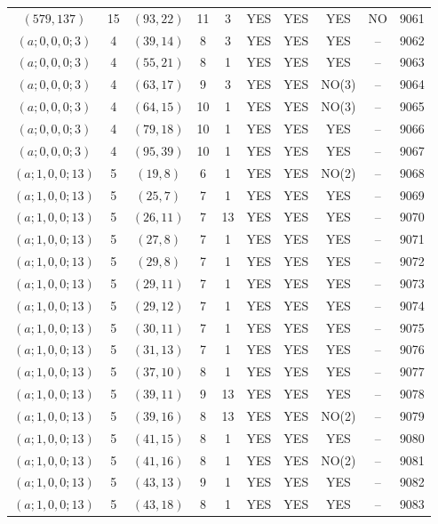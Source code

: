 \begin{longtable}{|c|c|c|c|c|c|c|c|c|c|}
$(579, 137)$ & 15 & $(93, 22)$ & 11 & 3 & YES & YES & YES & NO & 9061\\
$(a; 0, 0, 0; 3)$ & 4 & $(39, 14)$ & 8 & 3 & YES & YES & YES & -- & 9062\\
$(a; 0, 0, 0; 3)$ & 4 & $(55, 21)$ & 8 & 1 & YES & YES & YES & -- & 9063\\
$(a; 0, 0, 0; 3)$ & 4 & $(63, 17)$ & 9 & 3 & YES & YES & NO(3) & -- & 9064\\
$(a; 0, 0, 0; 3)$ & 4 & $(64, 15)$ & 10 & 1 & YES & YES & NO(3) & -- & 9065\\
$(a; 0, 0, 0; 3)$ & 4 & $(79, 18)$ & 10 & 1 & YES & YES & YES & -- & 9066\\
$(a; 0, 0, 0; 3)$ & 4 & $(95, 39)$ & 10 & 1 & YES & YES & YES & -- & 9067\\
$(a; 1, 0, 0; 13)$ & 5 & $(19, 8)$ & 6 & 1 & YES & YES & NO(2) & -- & 9068\\
$(a; 1, 0, 0; 13)$ & 5 & $(25, 7)$ & 7 & 1 & YES & YES & YES & -- & 9069\\
$(a; 1, 0, 0; 13)$ & 5 & $(26, 11)$ & 7 & 13 & YES & YES & YES & -- & 9070\\
$(a; 1, 0, 0; 13)$ & 5 & $(27, 8)$ & 7 & 1 & YES & YES & YES & -- & 9071\\
$(a; 1, 0, 0; 13)$ & 5 & $(29, 8)$ & 7 & 1 & YES & YES & YES & -- & 9072\\
$(a; 1, 0, 0; 13)$ & 5 & $(29, 11)$ & 7 & 1 & YES & YES & YES & -- & 9073\\
$(a; 1, 0, 0; 13)$ & 5 & $(29, 12)$ & 7 & 1 & YES & YES & YES & -- & 9074\\
$(a; 1, 0, 0; 13)$ & 5 & $(30, 11)$ & 7 & 1 & YES & YES & YES & -- & 9075\\
$(a; 1, 0, 0; 13)$ & 5 & $(31, 13)$ & 7 & 1 & YES & YES & YES & -- & 9076\\
$(a; 1, 0, 0; 13)$ & 5 & $(37, 10)$ & 8 & 1 & YES & YES & YES & -- & 9077\\
$(a; 1, 0, 0; 13)$ & 5 & $(39, 11)$ & 9 & 13 & YES & YES & YES & -- & 9078\\
$(a; 1, 0, 0; 13)$ & 5 & $(39, 16)$ & 8 & 13 & YES & YES & NO(2) & -- & 9079\\
$(a; 1, 0, 0; 13)$ & 5 & $(41, 15)$ & 8 & 1 & YES & YES & YES & -- & 9080\\
$(a; 1, 0, 0; 13)$ & 5 & $(41, 16)$ & 8 & 1 & YES & YES & NO(2) & -- & 9081\\
$(a; 1, 0, 0; 13)$ & 5 & $(43, 13)$ & 9 & 1 & YES & YES & YES & -- & 9082\\
$(a; 1, 0, 0; 13)$ & 5 & $(43, 18)$ & 8 & 1 & YES & YES & YES & -- & 9083\\

\end{longtable}
